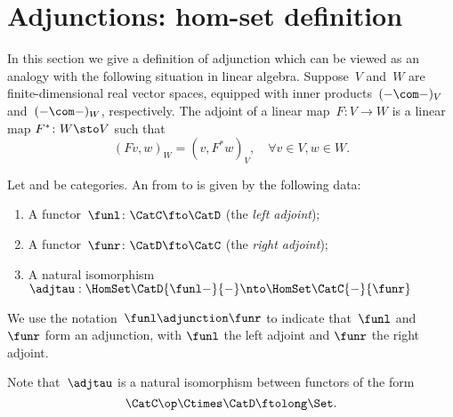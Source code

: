 

\section{Adjunctions: hom-set definition}
In this section we give a definition of adjunction which can be viewed as an analogy with the following situation in linear algebra.
Suppose~$V$ and~$W$ are finite-dimensional real vector spaces, equipped with inner products~$(-\com -)_V$ and~$(- \com -)_W$, respectively.
The adjoint of a linear map~$F\colon V \to W$ is a linear map $F^*\colon W \sto V$ such that
\begin{equation*}
	(Fv, w)
	_W = (v, F^*w)_V, \quad \forall v \in V, w \in W.
\end{equation*}

\begin{ctdefinition}
	\label{def:adj-iso}
	\label{def:cat-adjunction-v1}
	Let \CatC and \CatD be categories.
	An \emph{} from \CatC to \CatD is given by the following data:
	\begin{enumerate}
		\item A functor~$\funl\colon \CatC \fto \CatD$ (the \emph{left adjoint});
		\item A functor~$\funr\colon \CatD \fto \CatC$ (the \emph{right adjoint});
		\item A natural isomorphism~$\adjtau: \HomSet\CatD{\funl -}{-} \nto \HomSet\CatC{-}{\funr}$
	\end{enumerate}
	We use the notation~$\funl \adjunction  \funr$ to indicate that~$\funl$ and~$\funr$ form an adjunction, with $\funl$ the left adjoint and $\funr$ the right adjoint.
\end{ctdefinition}

\begin{remark}
	Note that~$\adjtau$ is a natural isomorphism between functors of the form
	\begin{equation}
		\CatC\op \Ctimes \CatD \ftolong   \Set.
	\end{equation}
\end{remark}

